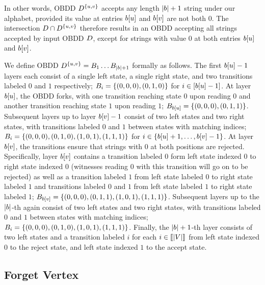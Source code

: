 In other words, OBDD $D^{\{u,v\}}$ accepts any length $|b|+1$ string under our alphabet, provided its value at entries $b[u]$ and $b[v]$ are not both $0$. The intersection $D \cap D^{\{u,v\}}$ therefore results in an OBDD accepting all strings accepted by input OBDD $D$, except for strings with value $0$ at both entries $b[u]$ and $b[v]$.

We define OBDD $D^{\{u,v\}} = B_1\dots B_{|b|+1}$ formally as follows. The first $b[u] -1$ layers each consist of a single left state, a single right state, and two transitions labeled $0$ and $1$ respectively; $B_i = \{(0,0,0), (0,1,0)\}$ for $i \in [b[u] -1]$. At layer $b[u]$, the OBDD forks, with one transition reaching state $0$ upon reading $0$ and another transition reaching state $1$ upon reading $1$; $B_{b[u]} = \{(0,0,0),(0,1,1)\}$. Subsequent layers up to layer $b[v]-1$ consist of two left states and two right states, with transitions labeled $0$ and $1$ between states with matching indices; $B_i = \{(0,0,0),(0,1,0),(1,0,1),(1,1,1)\}$ for $i \in \{b[u]+1,\ldots,b[v]-1\}$. At layer $b[v]$, the transitions ensure that strings with $0$ at both positions are rejected. Specifically, layer $b[v]$ contains a transition labeled $0$ form left state indexed $0$ to right state indexed $0$ (witnesses reading $0$ with this transition will go on to be rejected) as well as a transition labeled $1$ from left state labeled $0$ to right state labeled $1$ and transitions labeled $0$ and $1$ from left state labeled $1$ to right state labeled $1$; $B_{b[v]} = \{(0,0,0),(0,1,1),(1,0,1),(1,1,1)\}$.
Subsequent layers up to the $|b|$-th again consist of two left states and two right states, with transitions labeled $0$ and $1$ between states with matching indices; $B_i = \{(0,0,0),(0,1,0),(1,0,1),(1,1,1)\}$. Finally, the $|b|+1$-th layer consists of two left states and a transition labeled $i$ for each $i\in \llbracket |V| \rrbracket$ from left state indexed $0$ to the reject state, and left state indexed $1$ to the accept state.

\subsection{Forget Vertex}

